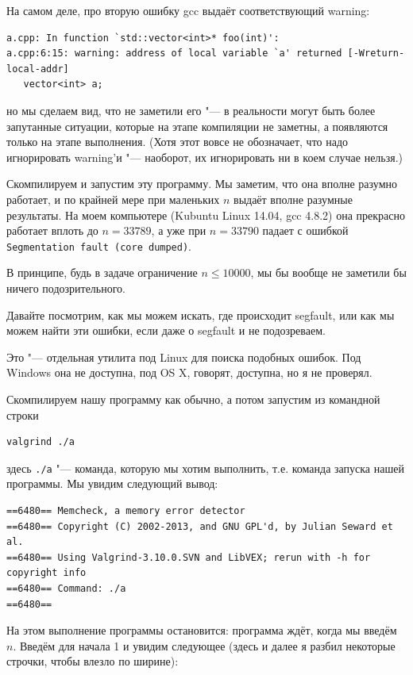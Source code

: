 \documentclass[a4paper,10pt]{problems}
\begin{document}
На самом деле, про вторую ошибку gcc выдаёт соответствующий warning:
\begin{verbatim}
a.cpp: In function `std::vector<int>* foo(int)':
a.cpp:6:15: warning: address of local variable `a' returned [-Wreturn-local-addr]
   vector<int> a;
\end{verbatim}
но мы сделаем вид, что не заметили его "--- в реальности могут быть более запутанные ситуации, которые на этапе компиляции не заметны, а появляются
только на этапе выполнения. 
(Хотя этот вовсе не обозначает, что надо игнорировать warning'и "--- наоборот, их игнорировать ни в коем случае нельзя.)

Скомпилируем и запустим эту программу. 
Мы заметим, что она вполне разумно работает, и по крайней мере при маленьких $n$ выдаёт вполне разумные результаты.
На моем компьютере (Kubuntu Linux 14.04, gcc 4.8.2) она прекрасно работает вплоть до $n=33789$, 
а уже при $n=33790$ падает с ошибкой \verb`Segmentation fault (core dumped)`.

В принципе, будь в задаче ограничение $n\leq 10000$, мы бы вообще не заметили бы ничего подозрительного.

Давайте посмотрим, как мы можем искать, где происходит segfault, или как мы можем найти эти ошибки, если даже о segfault и не подозреваем.

 Это "--- отдельная утилита под Linux для поиска подобных ошибок. Под Windows она не доступна, под OS X, говорят, доступна, но я не проверял.

Скомпилируем нашу программу как обычно, а потом запустим из командной строки
\begin{verbatim}
valgrind ./a
\end{verbatim}
здесь \verb`./a` "--- команда, которую мы хотим выполнить, т.е. команда запуска нашей программы. Мы увидим следующий вывод:
\begin{verbatim}
==6480== Memcheck, a memory error detector
==6480== Copyright (C) 2002-2013, and GNU GPL'd, by Julian Seward et al.
==6480== Using Valgrind-3.10.0.SVN and LibVEX; rerun with -h for copyright info
==6480== Command: ./a
==6480== 
\end{verbatim}
На этом выполнение программы остановится: программа ждёт, когда мы введём $n$. 
Введём для начала 1 и увидим следующее (здесь и далее я разбил некоторые строчки, чтобы влезло по ширине):
\end{document}
